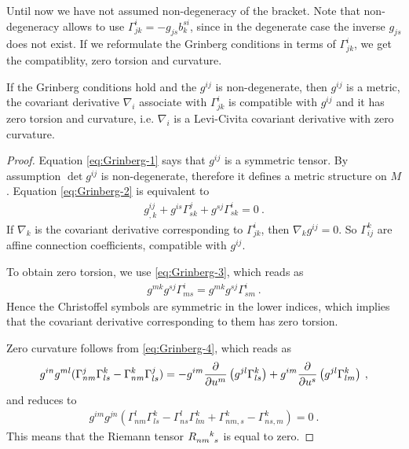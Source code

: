Until now we have not assumed non-degeneracy of the bracket. Note that non-degeneracy allows to use $\Gamma^{i}_{jk} = - g_{js} b^{si}_k$, since in the degenerate case the inverse $g_{js}$ does not exist. If we reformulate the Grinberg conditions in terms of $\Gamma^{i}_{jk}$, we get the compatiblity, zero torsion and curvature.

\begin{lemma}
    If the Grinberg conditions hold and the $g^{ij}$ is non-degenerate, then $g^{ij}$ is a metric, the covariant derivative $\nabla_i$ associate with $\Gamma^{i}_{jk}$ is compatible with $g^{ij}$ and it has zero torsion and curvature, i.e. $\nabla_i$ is a Levi-Civita covariant derivative with zero curvature.
\end{lemma}
\begin{proof}
    Equation \eqref{eq:Grinberg-1} says that $g^{ij}$ is a symmetric tensor. By assumption $\det g^{ij}$ is non-degenerate, therefore it defines a metric structure on $M$. Equation \eqref{eq:Grinberg-2} is equivalent to
    \begin{align}
        g^{ij}_{,k} + g^{is} \Gamma_{sk}^j + g^{sj} \Gamma_{sk}^i = 0 \:.
    \end{align}
    If $\nabla_k$ is the covariant derivative corresponding to $\Gamma^i_{jk}$, then $\nabla_k g^{ij} = 0$. So $\Gamma_{ij}^k$ are affine connection coefficients, compatible with $g^{ij}$.

    To obtain zero torsion, we use \eqref{eq:Grinberg-3}, which reads as 
    \begin{align}
        g^{mk} g^{sj} \Gamma^i_{ms} = g^{mk} g^{sj} \Gamma^i_{sm} \:.
    \end{align}
    Hence the Christoffel symbols are symmetric in the lower indices, which implies that the covariant derivative corresponding to them has zero torsion.

    Zero curvature follows from \eqref{eq:Grinberg-4}, which reads as
    \begin{align}
        g^{in} g^{ml} (\Gamma^j_{nm} \Gamma^{k}_{ls} - \Gamma^k_{nm} \Gamma^j_{ls}) = - g^{im} \frac{\partial }{\partial u^m} \left( g^{jl} \Gamma^k_{ls}\right) + g^{im} \frac{\partial }{\partial u^s}\left( g^{jl} \Gamma^k_{lm}\right) \:,
    \end{align}
    and reduces to
    \begin{align}
        g^{im} g^{jn} \left( \Gamma^{l}_{nm} \Gamma^{k}_{ls} - \Gamma^{l}_{ns} \Gamma^k_{lm} + \Gamma^k_{nm,s} - \Gamma^k_{ns,m} \right) = 0 \:.
    \end{align}
    This means that the Riemann tensor $R\indices{_n_m^k_s}$ is equal to zero.
\end{proof}

